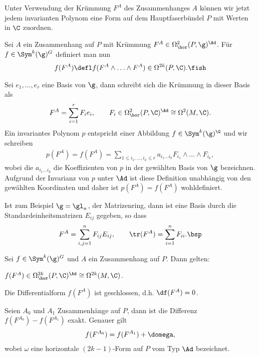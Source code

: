 \documentclass[%
	paper=a5,%
	fleqn,%
	DIV=18,%
	BCOR=0mm,
	fontsize=11pt,
	titlepage=false,%
	bibliography=totoc,
	DIV=18,%
	twoside=true,
	pdftitle=Riemannsche Geometrie,
	pdfauthor=Uwe Semmelmann,
	numbers=noendperiod]%
	{scrbook}
\begin{document}
Unter Verwendung der Krümmung $F^A$ des Zusammenhanges $A$ können wir jetzt
jedem invarianten Polynom eine Form auf dem Hauptfaserbündel $P$ mit Werten in
$\C$ zuordnen.

\begin{defn}
Sei $A$ ein Zusammenhang auf $P$ mit Krümmung $F^A\in\Omega_\hor^2(P,\g)^\Ad$.
Für $f\in \Sym^k(\g)^G$ definiert man nun
\begin{align*}
f(F^A) \defl f(F^A\wedge \ldots \wedge F^A)\in \Omega^{2k}(P,\C).\fish
\end{align*}
\end{defn}

\begin{ex}
Sei $e_1,\ldots,e_r$ eine Basis von $\g$, dann schreibt sich die Krümmung in
dieser Basis als
\begin{align*}
F^A = \sum_{i=1}^r F_i e_i,\qquad F_i\in\Omega_\hor^2(P,\C)^\Ad \cong
\Omega^2(M,\C).
\end{align*}
Ein invariantes Polynom $p$ entspricht einer Abbildung $f\in \Sym^k(\g)^\G$  und
wir schreiben
\begin{align*}
p(F^A) = f(F^A) = \sum_{1\le i_1,\ldots,i_k\le r} a_{i_1\ldots i_k}
F_{i_1}\wedge \ldots \wedge F_{i_k},
\end{align*}
wobei die $a_{i_1\ldots i_k}$ die Koeffizienten von $p$ in der gewählten Basis
von $\g$ bezeichnen. Aufgrund der Invarianz von $p$ unter $\Ad$ ist diese
Definition unabhängig von den gewählten Koordinaten und daher ist $p(F^A)
= f(F^A)$ wohldefiniert.

Ist zum Beispiel $\g = \gl_n$, der Matrizenring, dann ist eine Basis durch die
Standardeinheitsmatrizen $E_{ij}$ gegeben, so dass
\begin{align*}
F^A = \sum_{i,j=1}^n F_{ij}E_{ij},\qquad \tr(F^A) = \sum_{i=1}^n F_{ii}.\bsp
\end{align*}
\end{ex}

\begin{lem}
Sei $f\in \Sym^k(\g)^G$ und $A$ ein Zusammenhang auf $P$. Dann gelten:
\begin{propenum}
\item $f(F^A) \in \Omega_\hor^{2k}(P,\C)^{\Ad}\cong \Omega^{2k}(M,\C)$.
\item Die Differentialform $f(F^A)$ ist geschlossen, d.h. $\df(F^A) = 0$.
\item Seien $A_0$ und $A_1$ Zusammenhänge auf $P$, dann ist die
Differenz $f(F^{A_0})-f(F^{A_1})$ exakt. Genauer gilt
\begin{align*}
f(F^{A_0}) = f(F^{A_1}) + \domega,
\end{align*}
wobei $\omega$ eine horizontale $(2k-1)$-Form auf $P$ vom Typ $\Ad$
bezeichnet.~\fish
\end{propenum}
\end{lem}
\end{document}
